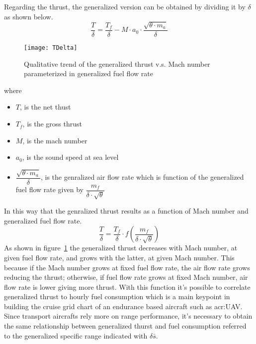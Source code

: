 \bigskip
\noindent
Regarding the thrust, the generalized version can be obtained by dividing it by $\delta$ as shown below.
\begin{equation}
\frac{T}{\delta}=\frac{T_{f}}{\delta}-M\cdot a_{0}\cdot \frac{\sqrt{\theta \cdot m_{a}}}{\delta}
\label{eqn:Equation1}
\end{equation}
%
\begin{figure}[!ht]
\centering
\texttt{[image: TDelta]}
\caption{Qualitative trend of  the generalized thrust v.s. Mach number parameterized in generalized fuel flow rate}
\label{fig:Figure1}
\end{figure}
%
where
%
\begin{itemize}
\item $T$, is the net thust
\item $T_{f}$, is the gross thrust
\item $M$, is the mach number
\item $a_{0}$, is the sound speed at sea level
\item $\dfrac{\sqrt{\theta \cdot m_{a}}}{\delta}$, is the genralized air flow rate which is function of the generalized fuel flow rate given by $\dfrac{m_{f}}{\delta \cdot \sqrt{\theta}}$
\end{itemize}
%
\noindent
In this way that the genralized thrust results as a function of Mach number and generalized fuel flow rate.
%
\begin{equation}
\frac{T}{\delta}=\frac{T_{f}}{\delta}\cdot f\left(\frac{m_{f}}{\delta \cdot \sqrt{\theta}}\right)
\label{eqn:Equation2}
\end{equation}
%
\noindent
As shown in figure~\ref{fig:Figure1} the generalized thrust decreases with Mach number, at given fuel flow rate, and grows with the latter, at given Mach number. This because if the Mach number grows at fixed fuel flow rate, the air flow rate grows reducing the thrust; otherwise, if fuel flow rate grows at fixed Mach number, air flow rate is lower giving more thrust.
%
With this function it's possible to correlate generalized thrust to hourly fuel consumption which is a main keypoint in building the cruise grid chart of an endurance based aircraft such as \gls{acr:UAV}. 
%
Since transport aircrafts rely more on range performance, it's necessary to obtain the same relationship between generalized thurst and fuel consumption referred to the generalized specific range indicated with $\delta\bar s $. 


